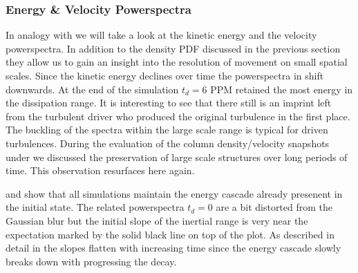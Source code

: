 \subsubsection{Energy \& Velocity Powerspectra}
In analogy with  we will take a look at the kinetic
energy and the velocity powerspectra. In addition to the density PDF discussed
in the previous section they allow us to gain an insight into the resolution
of movement on small spatial scales. Since the kinetic energy declines over
time the powerspectra in  shift downwards.
At the end of the simulation $t_d = 6$ PPM retained the most energy in the
dissipation range. It is interesting to see that there still is an imprint left from
the turbulent driver who produced the original turbulence in the first place.
The buckling of the spectra within the large scale range is typical for
driven turbulences. During the evaluation of the column density/velocity snapshots
under  we discussed the preservation of large scale
structures over long periods of time. This observation resurfaces here again.

 and
 show that all simulations
maintain the energy cascade already presenent in the initial state. The related
powerspectra $t_d = 0$ are a bit distorted from the Gaussian blur but the
initial slope of the inertial range is very near the expectation marked by the
solid black line on top of the plot. As described in detail in
 the slopes flatten with increasing time since the energy
cascade slowly breaks down with progressing the decay.



